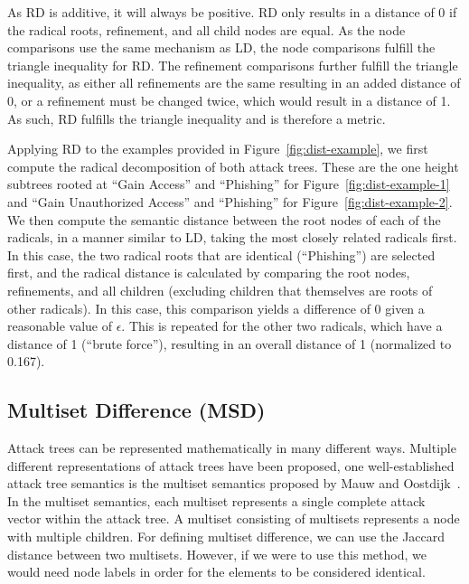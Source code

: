 As RD is additive, it will always be positive. RD only results in a distance of 0 if the radical roots, refinement, and all child nodes are equal. As the node comparisons use the same mechanism as LD, the node comparisons fulfill the triangle inequality for RD. The refinement comparisons further fulfill the triangle inequality, as either all refinements are the same resulting in an added distance of 0, or a refinement must be changed twice, which would result in a distance of 1. As such, RD fulfills the triangle inequality and is therefore a metric.


Applying RD to the examples provided in Figure~\ref{fig:dist-example}, we first compute the radical decomposition of both attack trees. These are the one height subtrees rooted at ``Gain Access'' and ``Phishing'' for Figure~\ref{fig:dist-example-1} and ``Gain Unauthorized Access'' and ``Phishing'' for Figure~\ref{fig:dist-example-2}. We then compute the semantic distance between the root nodes of each of the radicals, in a manner similar to LD, taking the most closely related radicals first. In this case, the two radical roots that are identical (``Phishing'') are selected first, and the radical distance is calculated by comparing the root nodes, refinements, and all children (excluding children that themselves are roots of other radicals). In this case, this comparison yields a difference of 0 given a reasonable value of $\epsilon$. This is repeated for the other two radicals, which have a distance of 1 (``brute force''), resulting in an overall distance of 1 (normalized to 0.167).


\subsection{Multiset Difference (MSD)}
\label{ssec:msd}

Attack trees can be represented mathematically in many different ways. Multiple different representations of attack trees have been proposed, one well-established attack tree semantics is the multiset semantics proposed by Mauw and Oostdijk~\cite{mauw_foundations_2006}. In the multiset semantics, each multiset represents a single complete attack vector within the attack tree. A multiset consisting of multisets represents a node with multiple children. For defining multiset difference, we can use the Jaccard distance between two multisets. However, if we were to use this method, we would need node labels in order for the elements to be considered identical.

